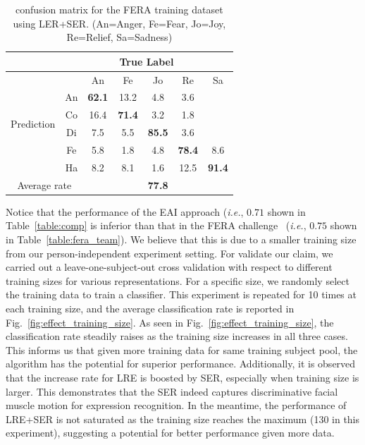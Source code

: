 \documentclass[journal]{IEEEtran}
\begin{document}
\begin{table}[htbp]
\caption{confusion matrix for the FERA training dataset using LER+SER.
(An=Anger, Fe=Fear, Jo=Joy, Re=Relief, Sa=Sadness)}
\begin{center}
\label{table:mat_fera}
\begin{tabular}{c|c|ccccc}
&\multicolumn{6}{c}{True Label} \\ \hline
\multirow{6}{*}{\begin{sideways}Prediction\end{sideways}} && An & Fe & Jo & Re & Sa \\ \cline{2-7}
&An				&\textbf{62.1} &13.2  &4.8  &3.6  &   \\ \cline{2-2}
&Co       &16.4  &\textbf{71.4}  &3.2   &1.8   & \\ \cline{2-2}
&Di       &7.5  &5.5   &\textbf{85.5} &3.6  &    \\ \cline{2-2}
&Fe       &5.8   &1.8   &4.8   &\textbf{78.4} &8.6    \\ \cline{2-2}
&Ha       &8.2   &8.1   &1.6  &12.5 &\textbf{91.4}  \\ \cline{2-2}\hline
\multicolumn{2}{c|}{Average rate} &\multicolumn{5}{c}{\textbf{77.8}} \\

\end{tabular}
\end{center}
\end{table}

Notice that the performance of the EAI approach (\textit{i.e.}, $0.71$ shown in Table~\ref{table:comp} is inferior than that in the FERA challenge~\cite{Yang_SMCB12} (\textit{i.e.}, $0.75$ shown in Table~\ref{table:fera_team}). We believe that this is due to a smaller training size from our person-independent experiment setting. For validate our claim, we carried out a leave-one-subject-out cross validation with respect to different training sizes for various representations. For a specific size, we randomly select the training data to train a classifier. This experiment is repeated for 10 times at each training size, and the average classification rate is reported in Fig.~\ref{fig:effect_training_size}. As seen in Fig.~\ref{fig:effect_training_size}, the classification rate steadily raises as the training size increases in all three cases. This informs us that given more training data for same training subject pool, the algorithm has the potential for superior performance. Additionally, it is observed that the increase rate for LRE is boosted by SER, especially when training size is larger. This demonstrates that the SER indeed captures discriminative facial muscle motion for expression recognition. In the meantime, the performance of LRE+SER is not saturated as the training size reaches the maximum (130 in this experiment), suggesting a potential for better performance given more data.
\end{document}
